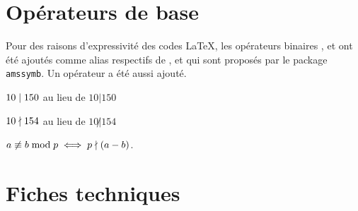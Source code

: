 \documentclass[12pt,a4paper]{article}
\begin{document}
\section{Opérateurs de base}

Pour des raisons d'expressivité des codes \LaTeX{}, les opérateurs binaires ,  et  ont été ajoutés comme alias respectifs de ,  et  qui sont proposés par le package \verb+amssymb+. Un opérateur  a été aussi ajouté.

\begin{latexex}
$10 \mid 150$ au lieu de
$10 | 150$

$10 \nmid 154$ au lieu de
$10 \not| 154$

$    a \nequiv b \modulo p
\iff p \ndivides (a - b)$.
\end{latexex}




\section{Fiches techniques}



\extraspace


\extraspace

\end{document}

